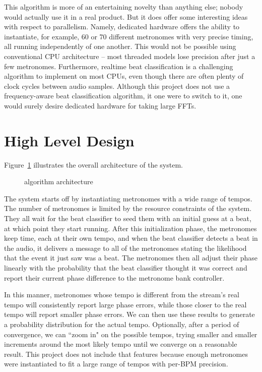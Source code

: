 \documentclass[letterpaper]{article}
\begin{document}
    This algorithm is more of an entertaining novelty than anything else;
    nobody would actually use it in a real product.  But it does offer some
    interesting ideas with respect to parallelism.  Namely, dedicated hardware
    offers the ability to instantiate, for example, 60 or 70 different
    metronomes with very precise timing, all running independently of one
    another.  This would not be possible using conventional CPU architecture --
    most threaded models lose precision after just a few metronomes.
    Furthermore, realtime beat classification is a challenging algorithm to
    implement on most CPUs, even though there are often plenty of clock cycles
    between audio samples.  Although this project does not use a
    frequency-aware beat classification algorithm, it one were to switch to it,
    one would surely desire dedicated hardware for taking large FFTs.


\section{High Level Design}
    
    Figure~\ref{fig:architecture} illustrates the overall
    architecture of the system.

    \begin{figure}
        \centering
        \caption{\projname algorithm architecture}
        \label{fig:architecture}
    \end{figure}

    The system starts off by instantiating metronomes with a wide range of
    tempos.  The number of metronomes is limited by the resource constraints of
    the system.  They all wait for the beat classifier to seed them with an
    initial guess at a beat, at which point they start running.  After this
    initialization phase, the metronomes keep time, each at their own tempo,
    and when the beat classifier detects a beat in the audio, it delivers a
    message to all of the metronomes stating the likelihood that the event it
    just saw was a beat.  The metronomes then all adjust their phase linearly
    with the probability that the beat classifier thought it was correct and
    report their current phase difference to the metronome bank controller.

    In this manner, metronomes whose tempo is different from the stream's real
    tempo will consistently report large phase errors, while those closer to
    the real tempo will report smaller phase errors.  We can then use these
    results to generate a probability distribution for the actual tempo.
    Optionally, after a period of convergence, we can ``zoom in" on the
    possible tempos, trying smaller and smaller increments around the most
    likely tempo until we converge on a reasonable result.  This project does
    not include that features because enough metronomes were instantiated to
    fit a large range of tempos with per-BPM precision.
\end{document}
